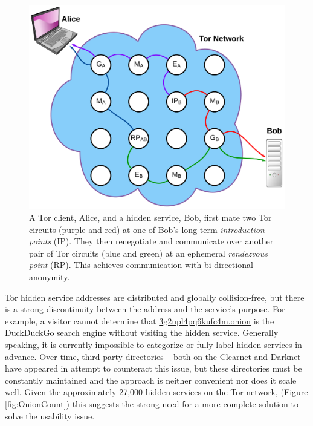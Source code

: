 \documentclass[conference]{IEEEtran}
\begin{document}
\begin{figure}[htbp]
	\centering
	\includegraphics[width=0.9\linewidth]{../assets/images/LucidCharts/Hidden_Services.pdf}
	\caption{A Tor client, Alice, and a hidden service, Bob, first mate two Tor circuits (purple and red) at one of Bob's long-term \emph{introduction points} (IP). They then renegotiate and communicate over another pair of Tor circuits (blue and green) at an ephemeral \emph{rendezvous point} (RP). This achieves communication with bi-directional anonymity\cite{overlier2006locating}.}
\end{figure}

Tor hidden service addresses are distributed and globally collision-free, but there is a strong discontinuity between the address and the service's purpose. For example, a visitor cannot determine that \url{3g2upl4pq6kufc4m.onion} is the DuckDuckGo search engine without visiting the hidden service. Generally speaking, it is currently impossible to categorize or fully label hidden services in advance. Over time, third-party directories -- both on the Clearnet and Darknet -- have appeared in attempt to counteract this issue, but these directories must be constantly maintained and the approach is neither convenient nor does it scale well. Given the approximately 27,000 hidden services on the Tor network,  (Figure \ref{fig:OnionCount}) this suggests the strong need for a more complete solution to solve the usability issue.
\end{document}
